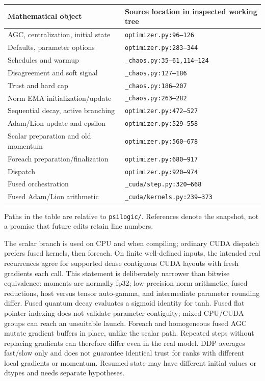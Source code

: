 \documentclass[11pt]{article}
\theoremstyle{definition}
\theoremstyle{remark}
\begin{document}
\begin{center}\small
\begin{tabular}{p{.38\linewidth}p{.53\linewidth}}
\toprule
Mathematical object & Source location in inspected working tree\\
\midrule
AGC, centralization, initial state & \texttt{optimizer.py:96--126}\\
Defaults, parameter options & \texttt{optimizer.py:283--344}\\
Schedules and warmup & \texttt{\_chaos.py:35--61,114--124}\\
Disagreement and soft signal & \texttt{\_chaos.py:127--186}\\
Trust and hard cap & \texttt{\_chaos.py:186--207}\\
Norm EMA initialization/update & \texttt{\_chaos.py:263--282}\\
Sequential decay, active branching & \texttt{optimizer.py:472--527}\\
Adam/Lion update and epsilon & \texttt{optimizer.py:529--558}\\
Scalar preparation and old momentum & \texttt{optimizer.py:560--678}\\
Foreach preparation/finalization & \texttt{optimizer.py:680--917}\\
Dispatch & \texttt{optimizer.py:920--974}\\
Fused orchestration & \texttt{\_cuda/step.py:320--668}\\
Fused Adam/Lion arithmetic & \texttt{\_cuda/kernels.py:239--373}\\
\bottomrule
\end{tabular}
\end{center}
Paths in the table are relative to \texttt{psilogic/}. References denote the
snapshot, not a promise that future edits retain line numbers.

The scalar branch is used on CPU and when compiling; ordinary CUDA dispatch
prefers fused kernels, then foreach. On finite well-defined inputs, the
intended real recurrences agree for supported dense contiguous CUDA layouts
with fresh gradients each call. This statement is deliberately narrower than
bitwise equivalence: moments are normally fp32; low-precision norm arithmetic,
fused reductions, host versus tensor auto-gamma, and intermediate parameter
rounding differ. Fused quantum decay evaluates a sigmoid identity for tanh.
Fused flat pointer indexing does not validate parameter contiguity; mixed
CPU/CUDA groups can reach an unsuitable launch. Foreach and homogeneous fused
AGC mutate gradient buffers in place, unlike the scalar path. Repeated steps
without replacing gradients can therefore differ even in the real model.
DDP averages fast/slow only and does not guarantee identical trust for ranks
with different local gradients or momentum. Resumed state may have different
initial values or dtypes and needs separate hypotheses.
\end{document}
